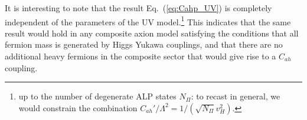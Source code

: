 It is interesting to note that the result Eq.~(\ref{eq:Cahp_UV}) is completely independent of the parameters of the UV model.\footnote{up to the number of degenerate ALP states $N_\Pi$: to recast in general, we would constrain the combination $C_{ah}' / \Lambda^2 = 1/({\sqrt{N_\Pi} v_H^2})$.}  This indicates that the same result would hold in any composite axion model satisfying the conditions that all fermion mass is generated by Higgs Yukawa couplings, and that there are no additional heavy fermions in the composite sector that would give rise to a $C_{ah}$ coupling.

